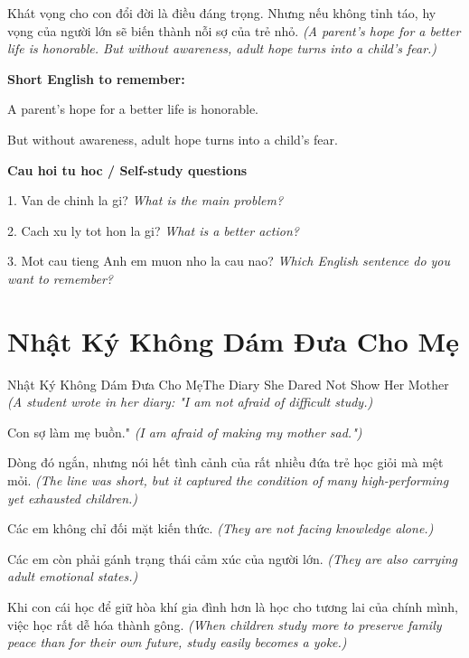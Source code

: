 \begin{baihoc}
Khát vọng cho con đổi đời là điều đáng trọng. Nhưng nếu không tỉnh táo, hy vọng của người lớn sẽ biến thành nỗi sợ của trẻ nhỏ.
\textit{(A parent’s hope for a better life is honorable. But without awareness, adult hope turns into a child’s fear.)}
\end{baihoc}

\begin{ghinhoanh}
\textbf{Short English to remember:}

A parent’s hope for a better life is honorable.

But without awareness, adult hope turns into a child’s fear.

\end{ghinhoanh}

\begin{tuhocnhanh}
\textbf{Cau hoi tu hoc / Self-study questions}

1. Van de chinh la gi? \textit{What is the main problem?}

2. Cach xu ly tot hon la gi? \textit{What is a better action?}

3. Mot cau tieng Anh em muon nho la cau nao? \textit{Which English sentence do you want to remember?}
\end{tuhocnhanh}
\ngancach

\section{Nhật Ký Không Dám Đưa Cho Mẹ}
\begin{truyen}{Nhật Ký Không Dám Đưa Cho Mẹ}{The Diary She Dared Not Show Her Mother}
\textit{(A student wrote in her diary: "I am not afraid of difficult study.)}

Con sợ làm mẹ buồn."
\textit{(I am afraid of making my mother sad.")}

Dòng đó ngắn, nhưng nói hết tình cảnh của rất nhiều đứa trẻ học giỏi mà mệt mỏi.
\textit{(The line was short, but it captured the condition of many high-performing yet exhausted children.)}

Các em không chỉ đối mặt kiến thức.
\textit{(They are not facing knowledge alone.)}

Các em còn phải gánh trạng thái cảm xúc của người lớn.
\textit{(They are also carrying adult emotional states.)}

Khi con cái học để giữ hòa khí gia đình hơn là học cho tương lai của chính mình, việc học rất dễ hóa thành gông.
\textit{(When children study more to preserve family peace than for their own future, study easily becomes a yoke.)}

\end{truyen}

